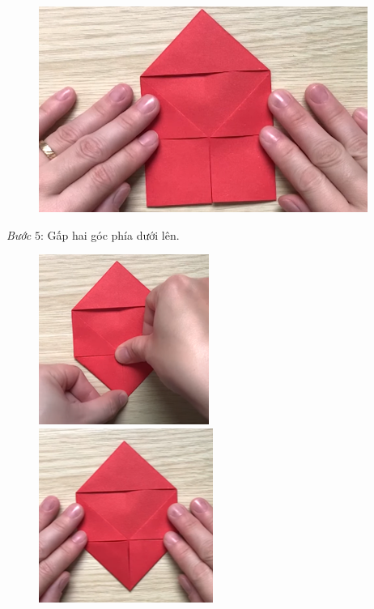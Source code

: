 \begin{multicols}{2}
\begin{figure}[H]
			\vspace*{1pt}
			\includegraphics[width=1\linewidth]{28}
			\vspace*{-10pt}
		\end{figure}
	\textit{Bước} $5$: Gấp hai góc phía dưới lên.
	\begin{figure}[H]
			\vspace*{-5pt}
			\centering
			\captionsetup{labelformat= empty, justification=centering}
			\includegraphics[height= 0.485\linewidth]{29}
			\includegraphics[height= 0.485\linewidth]{30}

\end{figure}
\end{multicols}
